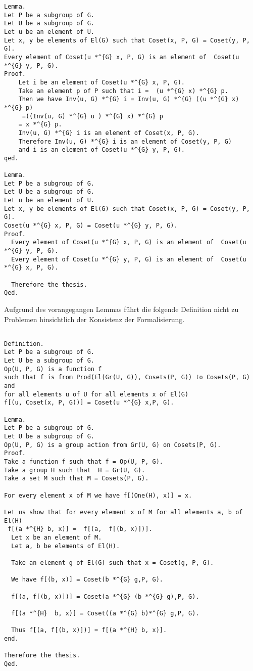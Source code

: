 \documentclass[a4paper,12pt]{scrartcl}
\begin{document}
\begin{lstlisting}
Lemma.
Let P be a subgroup of G.
Let U be a subgroup of G.
Let u be an element of U.
Let x, y be elements of El(G) such that Coset(x, P, G) = Coset(y, P, G). 
Every element of Coset(u *^{G} x, P, G) is an element of  Coset(u *^{G} y, P, G).
Proof.
    Let i be an element of Coset(u *^{G} x, P, G).
    Take an element p of P such that i =  (u *^{G} x) *^{G} p.
    Then we have Inv(u, G) *^{G} i = Inv(u, G) *^{G} ((u *^{G} x) *^{G} p)
     =((Inv(u, G) *^{G} u ) *^{G} x) *^{G} p
    = x *^{G} p.
    Inv(u, G) *^{G} i is an element of Coset(x, P, G).
    Therefore Inv(u, G) *^{G} i is an element of Coset(y, P, G)
    and i is an element of Coset(u *^{G} y, P, G).
qed.

Lemma.
Let P be a subgroup of G.
Let U be a subgroup of G.
Let u be an element of U.
Let x, y be elements of El(G) such that Coset(x, P, G) = Coset(y, P, G). 
Coset(u *^{G} x, P, G) = Coset(u *^{G} y, P, G).
Proof.
  Every element of Coset(u *^{G} x, P, G) is an element of  Coset(u *^{G} y, P, G).
  Every element of Coset(u *^{G} y, P, G) is an element of  Coset(u *^{G} x, P, G).

  Therefore the thesis.
Qed.

\end{lstlisting}

Aufgrund des vorangegangen Lemmas führt die folgende Definition nicht zu Problemen hinsichtlich der Konsistenz der Formalisierung.

\begin{lstlisting}

Definition.
Let P be a subgroup of G.
Let U be a subgroup of G.
Op(U, P, G) is a function f 
such that f is from Prod(El(Gr(U, G)), Cosets(P, G)) to Cosets(P, G) and
for all elements u of U for all elements x of El(G) 
f[(u, Coset(x, P, G))] = Coset(u *^{G} x,P, G).

Lemma.
Let P be a subgroup of G.
Let U be a subgroup of G.
Op(U, P, G) is a group action from Gr(U, G) on Cosets(P, G).
Proof.
Take a function f such that f = Op(U, P, G).
Take a group H such that  H = Gr(U, G).
Take a set M such that M = Cosets(P, G).

For every element x of M we have f[(One(H), x)] = x.

Let us show that for every element x of M for all elements a, b of El(H)
 f[(a *^{H} b, x)] =  f[(a,  f[(b, x)])].
  Let x be an element of M.
  Let a, b be elements of El(H).

  Take an element g of El(G) such that x = Coset(g, P, G).

  We have f[(b, x)] = Coset(b *^{G} g,P, G).

  f[(a, f[(b, x)])] = Coset(a *^{G} (b *^{G} g),P, G).

  f[(a *^{H}  b, x)] = Coset((a *^{G} b)*^{G} g,P, G).

  Thus f[(a, f[(b, x)])] = f[(a *^{H} b, x)].
end.

Therefore the thesis.
Qed.


\end{lstlisting}
\end{document}
